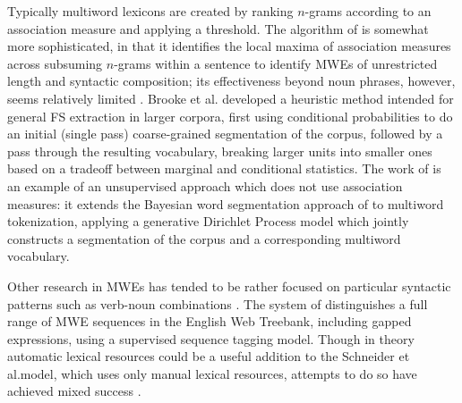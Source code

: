 \documentclass[11pt,letterpaper]{article}
\makeatletter
\def \al {al.\@ }
\makeatother
\begin{document}
Typically multiword lexicons are created by ranking $n$-grams according to an association measure and applying a threshold. The algorithm of  is somewhat more sophisticated, in that it identifies the local maxima of association measures across subsuming $n$-grams within a sentence to identify MWEs of unrestricted length and syntactic composition; its effectiveness beyond noun phrases, however, seems relatively limited \cite{Ramisch12}. Brooke et \al {} developed a heuristic method intended for general FS extraction in larger corpora, first using conditional probabilities to do an initial (single pass) coarse-grained segmentation of the corpus, followed by a pass through the resulting vocabulary, breaking larger units into smaller ones based on a tradeoff between marginal and conditional statistics. The work of  is an example of an unsupervised approach which does not use association measures: it extends the Bayesian word segmentation approach of  to multiword tokenization, applying a generative Dirichlet Process model which jointly constructs a segmentation of the corpus and a corresponding multiword vocabulary.

Other research in MWEs has tended to be rather focused on particular syntactic patterns such as verb-noun combinations \cite{Fazly09}. The system of  distinguishes a full range of MWE sequences in the English Web Treebank, including gapped expressions, using a supervised sequence tagging model. Though in theory automatic lexical resources could be a useful addition to the Schneider et \al model, which uses only manual lexical resources, attempts to do so have achieved mixed success \cite{Riedl16}. 
\end{document}
